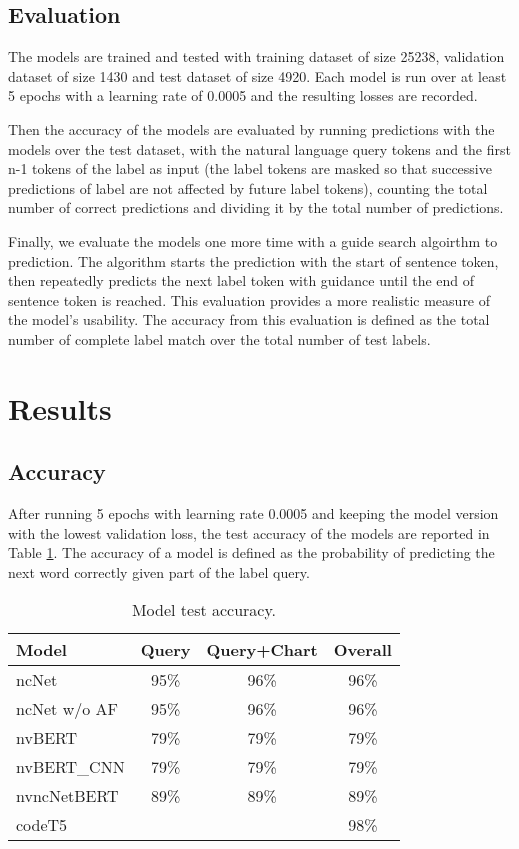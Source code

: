 \documentclass[
	a4paper, %
	10pt, %
	unnumberedsections, %
	twoside, %
]{t0003}
\begin{document}
\subsection{Evaluation}

The models are trained and tested with training dataset of size 25238, validation dataset of size 1430 and test dataset of size 4920. Each model is run over at least 5 epochs with a learning rate of 0.0005 and the resulting losses are recorded.

Then the accuracy of the models are evaluated by running predictions with the models over the test dataset, with the natural language query tokens and the first n-1 tokens of the label as input (the label tokens are masked so that successive predictions of label are not affected by future label tokens), counting the total number of correct predictions and dividing it by the total number of predictions.

Finally, we evaluate the models one more time with a guide search algoirthm to prediction. The algorithm starts the prediction with the start of sentence token, then repeatedly predicts the next label token with guidance until the end of sentence token is reached. This evaluation provides a more realistic measure of the model's usability. The accuracy from this evaluation is defined as the total number of complete label match over the total number of test labels.

\section{Results}

\subsection{Accuracy}

After running 5 epochs with learning rate 0.0005 and keeping the model version with the lowest validation loss, the test accuracy of the models are reported in Table \ref{tab:accuracy}. The accuracy of a model is defined as the probability of predicting the next word correctly given part of the label query.

\begin{table} %
	\caption{Model test accuracy.}
	\centering
	\begin{tabular}{lccc}
		\toprule
		Model & Query & Query+Chart & Overall  \\
		\midrule
		ncNet & 95\% & 96\% & 96\% \\
		ncNet w/o AF & 95\% & 96\% & 96\%  \\
		\hline
		nvBERT & 79\% & 79\% & 79\% \\
		nvBERT\_CNN &  79\% & 79\% & 79\% \\
		\hline
		nvncNetBERT & 89\% & 89\% & 89\% \\
		\hline
		codeT5 & & & 98\% \\
		\bottomrule
	\end{tabular}
	\label{tab:accuracy}
\end{table}
\end{document}
